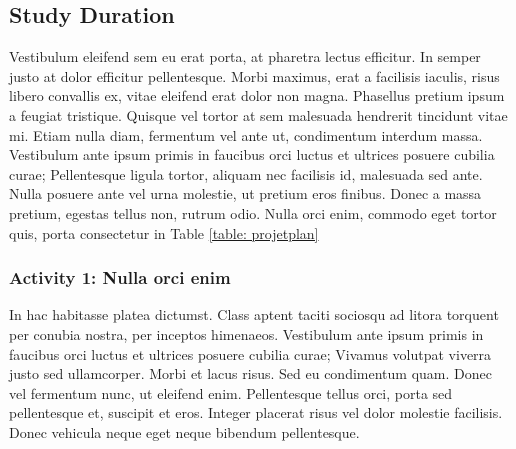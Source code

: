 \subsection{Study Duration}

Vestibulum eleifend sem eu erat porta, at pharetra lectus efficitur. In semper justo at dolor efficitur pellentesque. Morbi maximus, erat a facilisis iaculis, risus libero convallis ex, vitae eleifend erat dolor non magna. Phasellus pretium ipsum a feugiat tristique. Quisque vel tortor at sem malesuada hendrerit tincidunt vitae mi. Etiam nulla diam, fermentum vel ante ut, condimentum interdum massa. Vestibulum ante ipsum primis in faucibus orci luctus et ultrices posuere cubilia curae; Pellentesque ligula tortor, aliquam nec facilisis id, malesuada sed ante. Nulla posuere ante vel urna molestie, ut pretium eros finibus. Donec a massa pretium, egestas tellus non, rutrum odio. Nulla orci enim, commodo eget tortor quis, porta consectetur in Table \ref{table: projetplan}


\subsubsection*{Activity 1: Nulla orci enim}

In hac habitasse platea dictumst. Class aptent taciti sociosqu ad litora torquent per conubia nostra, per inceptos himenaeos. Vestibulum ante ipsum primis in faucibus orci luctus et ultrices posuere cubilia curae; Vivamus volutpat viverra justo sed ullamcorper. Morbi et lacus risus. Sed eu condimentum quam. Donec vel fermentum nunc, ut eleifend enim. Pellentesque tellus orci, porta sed pellentesque et, suscipit et eros. Integer placerat risus vel dolor molestie facilisis. Donec vehicula neque eget neque bibendum pellentesque.

